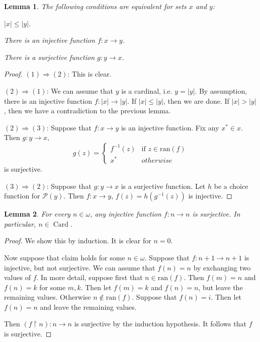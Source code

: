\documentclass[a4paper, 11pt]{amsart}
\newtheorem{lemma}[lemma]{Lemma}
\theoremstyle{remark}
\newcommand{\ran}{\mathrm{ran}}
\newcommand{\pow}{\mathcal{P}}
\DeclareMathOperator{\Card}{Card}
\newenvironment{enumerate-(1)}{\begin{enumerate}[label={\upshape (\arabic*)}, leftmargin=2pc]}{\end{enumerate}}
\begin{document}
\begin{lemma} 
\label{comparison of size} 
The following conditions are equivalent for sets $x$ and $y$: 
\begin{enumerate-(1)} 
\item 
$|x|\leq|y|$. 
\item 
There is an injective function $f\colon x\rightarrow y$. 
\item 
There is a surjective function $g\colon y\rightarrow x$. 
\end{enumerate-(1)} 
\end{lemma} 
\begin{proof} 
$(1)\Rightarrow (2)$: 
This is clear. 


$(2)\Rightarrow (1)$: 
We can assume that $y$ is a cardinal, i.e. $y=|y|$. 
By assumption, there is an injective function $f\colon |x|\rightarrow |y|$. 
If $|x|\leq|y|$, then we are done. 
If $|x|>|y|$, then we have a contradiction to the previous lemma. 

$(2)\Rightarrow (3)$: 
Suppose that $f\colon x\rightarrow y$ is an injective function. 
Fix any $x^*\in x$. 
Then $g\colon y\rightarrow x$, 
\begin{equation*}
    g(z) = 
    \begin{cases}
       f^{-1}(z) & \text{if } z\in \ran(f)   \\
       x^*       & otherwise
    \end{cases}
  \end{equation*}
is surjective. 

$(3)\Rightarrow (2)$: 
Suppose that $g\colon y\rightarrow x$ is a surjective function. 
Let $h$ be a choice function for $\pow(y)$. 
Then $f\colon x\rightarrow y$, $f(z) =  h(g^{-1}(z))$ is injective. 
\end{proof} 


\begin{lemma} 
For every $n\in\omega$, any injective function $f\colon n\rightarrow n$ is surjective. 
In particular, $n\in\Card$. 
\end{lemma} 
\begin{proof} 
We show this by induction. 
It is clear for $n=0$. 

Now suppose that claim holds for some $n\in\omega$.
Suppose that $f\colon n+1 \rightarrow n+1$ is injective, but not surjective. 
We can assume that $f(n)=n$ by exchanging two values of $f$. 
In more detail, suppose first that $n\in \ran(f)$.
Then $f(m)=n$ and $f(n)=k$ for some $m,k$. 
Then let $f(m)=k$ and $f(n)=n$, but leave the remaining values. 
Otherwise $n\notin \ran(f)$. 
Suppose that $f(n)=i$. 
Then let $f(n)=n$ and leave the remaining values. 

Then $(f{\upharpoonright}n) \colon n\rightarrow n$ is surjective by the induction hypothesis. 
It follows that $f$ is surjective. 
\end{proof} 
\end{document}
